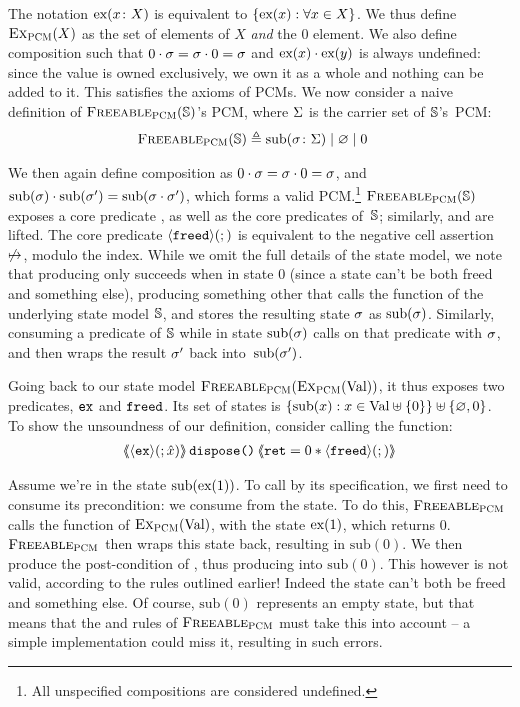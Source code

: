 The notation $\text{ex}(x\colon X)$ is equivalent to $\{ \text{ex}(x) : \forall x\in X \}$. We thus define $\textsc{Ex}_{\textsc{PCM}}(X)$ as the set of elements of $X$ \emph{and} the $0$ element. We also define composition such that $0\cdot \sigma=\sigma\cdot 0=\sigma$ and $\text{ex}(x) \cdot \text{ex}(y)$ is always undefined: since the value is owned exclusively, we own it as a whole and nothing can be added to it. This satisfies the axioms of PCMs. We now consider a naive definition of $\textsc{Freeable}_{\textsc{PCM}}(\mathbb S)$'s PCM, where $\Sigma$ is the carrier set of $\mathbb S$'s~PCM:
\begin{align*}
	\textsc{Freeable}_{\textsc{PCM}}(\mathbb S) &\triangleq \text{sub}(\sigma\colon \Sigma) \mid \varnothing \mid 0
\end{align*}

We then again define composition as $0 \cdot \sigma=\sigma \cdot 0=\sigma$, and $\text{sub}(\sigma) \cdot \text{sub}(\sigma')=\text{sub}(\sigma\cdot \sigma')$, which forms a valid PCM.\footnote{All unspecified compositions are considered undefined.} $\textsc{Freeable}_{\textsc{PCM}}(\mathbb S)$ exposes a core predicate \freedP, as well as the core predicates of~$\mathbb S$; similarly, \consume{} and \produce{} are lifted. The core predicate $\left<\texttt{freed}\right>\!(;)$ is equivalent to the negative cell assertion $\not\mapsto$, modulo the index. While we omit the full details of the state model, we note that producing \freedP{} only succeeds when in state $0$ (since a state can't be both freed and something else), producing something other that \freedP{} calls the \produce{} function of the underlying state model $\mathbb S$, and stores the resulting state $\sigma$ as $\text{sub}(\sigma)$. Similarly, consuming a predicate of $\mathbb S$ while in state $\text{sub}(\sigma)$ calls \consume{} on that predicate with $\sigma$, and then wraps the result $\sigma'$ back into~$\text{sub}(\sigma')$.

Going back to our state model $\textsc{Freeable}_{\textsc{PCM}}(\textsc{Ex}_{\textsc{PCM}}(\text{Val}))$, it thus exposes two predicates, $\texttt{ex}$ and $\texttt{freed}$. Its set of states is $\{\text{sub}(x) : x \in \text{Val} \uplus \{ 0 \} \} \uplus \{ \varnothing, 0 \}$. To show the unsoundness of our definition, consider calling the  function:
\begin{align*}
	\left<\mkern-5mu\left<\left<\texttt{ex}\right>\!(;\hat{x})\right>\mkern-5mu\right>\texttt{dispose()}\left<\mkern-5mu\left<\texttt{ret}=0 * \left<\texttt{freed}\right>\!(;)\right>\mkern-5mu\right>
\end{align*}

Assume we're in the state $\text{sub}(\text{ex}(1))$. To call  by its specification, we first need to consume its precondition: we consume  from the state. To do this, $\textsc{Freeable}_{\textsc{PCM}}$ calls the \consume{} function of $\textsc{Ex}_{\textsc{PCM}}(\text{Val})$, with the state $\text{ex}(1)$, which returns $0$. $\textsc{Freeable}_{\textsc{PCM}}$ then wraps this state back, resulting in $\text{sub}(0)$. We then produce the post-condition of , thus producing \corepred{\freedP}{}{} into $\text{sub}(0)$. This however is not valid, according to the rules outlined earlier! Indeed the state can't both be freed and something else. Of course, $\text{sub}(0)$ represents an empty state, but that means that the \consume{} and \produce{} rules of $\textsc{Freeable}_{\textsc{PCM}}$ must take this into account -- a simple implementation could miss it, resulting in such errors.

